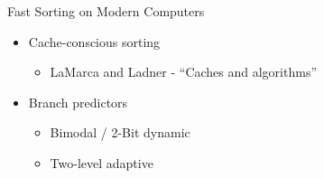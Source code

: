 \begin{slide}

\begin{stitle}
Fast Sorting on Modern Computers
\end{stitle}

\begin{itemize}
\item Cache-conscious sorting
\begin{itemize}
\item LaMarca and Ladner - ``Caches and algorithms''
\end{itemize}
\item Branch predictors
\begin{itemize}
\item Bimodal / 2-Bit dynamic
\pagebreak
\item Two-level adaptive
\begin{center}
\end{center}
\end{itemize}
\end{itemize}

\end{slide}
